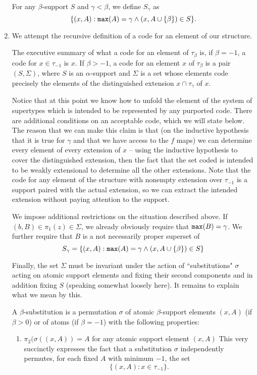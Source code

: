 \documentclass[12pt]{article}
\begin{document}
\begin{enumerate}
For any $\beta$-support $S$ and $\gamma<\beta$, we define $S_\gamma$ as $$\{(x,A):{\tt max}(A)=\gamma \wedge (x,A\cup \{\beta\}) \in S\}.$$

\item  We attempt the recursive definition of a code for an element of our structure.

The executive summary of what a code for an element of $\tau_\beta$ is, if $\beta=-1$, a code for $x \in \tau_{-1}$ is $x$.  If $\beta>-1$, a code for an element $x$ of $\tau_\beta$ is a pair $(S,\Sigma)$, where $S$ is an $\alpha$-support and
$\Sigma$ is a set whose elements code precisely the elements of the distinguished extension $x \cap \tau_\gamma$ of $x$.

Notice that at this point we know how to unfold the element of the system of supertypes which is intended to be represented by any purported code.  There are additional conditions on an acceptable code, which we will state below.
The reason that we can make this claim is that (on the inductive hypothesis that it is true for $\gamma$ and that we have access to the $f$ maps) we can determine every element of every extension of $x$ -- using the inductive hypothesis to cover the distinguished extension, then the fact
that the set coded is intended to be weakly extensional to determine all the other extensions.   Note that the code for any element of the structure with nonempty extension over  $\tau_{-1}$ is a support paired with the actual extension, so we can extract the intended extension without paying
attention to the support.

We impose additional restrictions on the situation described above.  If $(b,B) \in \pi_1(z) \in \Sigma$, we already obviously require that ${\tt max}(B)=\gamma$.  We further require that $B$ is a not necessarily proper superset of $$S_\gamma = \{(x,A):{\tt max}(A) = \gamma \wedge (x,A \cup \{\beta\}) \in S\}$$

Finally, the set $\Sigma$ must be invariant under the action of ``substitutions" $\sigma$ acting on atomic support elements and fixing their second components and in addition fixing $S$ (speaking somewhat loosely here).  It remains to explain what we mean by this.

A $\beta$-substitution is a permutation $\sigma$ of atomic $\beta$-support elements $(x,A)$ (if $\beta>0$) or of atoms (if $\beta=-1$) with the following properties:

\begin{enumerate}

\item $\pi_2(\sigma((x,A)) = A$ for any atomic support element $(x,A)$  This very succinctly expresses the fact that a substitution $\sigma$ independently permutes, for each fixed $A$ with minimum $-1$, the set $$\{(x,A):x \in \tau_{-1}\}.$$


\end{enumerate}
\end{enumerate}
\end{document}
